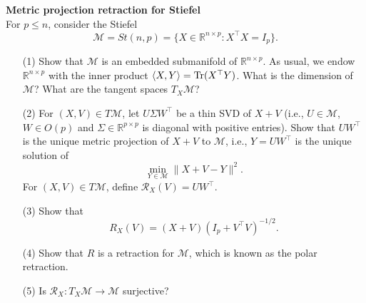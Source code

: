 \documentclass[en, oneside]{assignment}
\begin{document}
\begin{prob} \textbf{Metric projection retraction for Stiefel}\\
    For $p \leq n$, consider the Stiefel 
    \begin{equation*}
        \mathcal{M} = St(n, p) = \{X \in \mathbb{R}^{n \times p}: X^\top X = I_p\}.
    \end{equation*}
    \begin{itemize}
        \item[(1)] Show that $\mathcal{M}$ is an embedded submanifold of $\mathbb{R}^{n \times p}$. 
        As usual, we endow $\mathbb{R}^{n \times p}$ with the inner product $\langle X, Y \rangle = \operatorname{Tr}(X^\top Y)$. 
        What is the dimension of $\mathcal{M}$? What are the tangent spaces $T_X\mathcal{M}$?
        \item[(2)] For $(X, V) \in T\mathcal{M}$, let $U \Sigma W^\top$ be a thin SVD of $X + V$ 
        (i.e., $U \in \mathcal{M}$, $W \in O(p)$ and $\Sigma \in \mathbb{R}^{p \times p}$ is diagonal with positive entries). 
        Show that $UW^\top$ is the unique metric projection of $X + V$ to $\mathcal{M}$, i.e., $Y = UW^\top$ is the unique solution of
        \begin{equation*}
            \min_{Y \in \mathcal{M}} \|X + V - Y\|^2.
        \end{equation*}
        For $(X, V) \in T\mathcal{M}$, define $\mathcal{R}_X(V) = UW^\top$.
        \item[(3)] Show that
        \begin{equation*}
            R_X(V) = (X + V)(I_p + V^\top V)^{-1/2}.
        \end{equation*}
        \item[(4)] Show that $R$ is a retraction for $\mathcal{M}$, which is known as the polar retraction.
        \item[(5)] Is $\mathcal{R}_X: T_X\mathcal{M} \rightarrow \mathcal{M}$ surjective?
    \end{itemize}
\end{prob}
\end{document}
